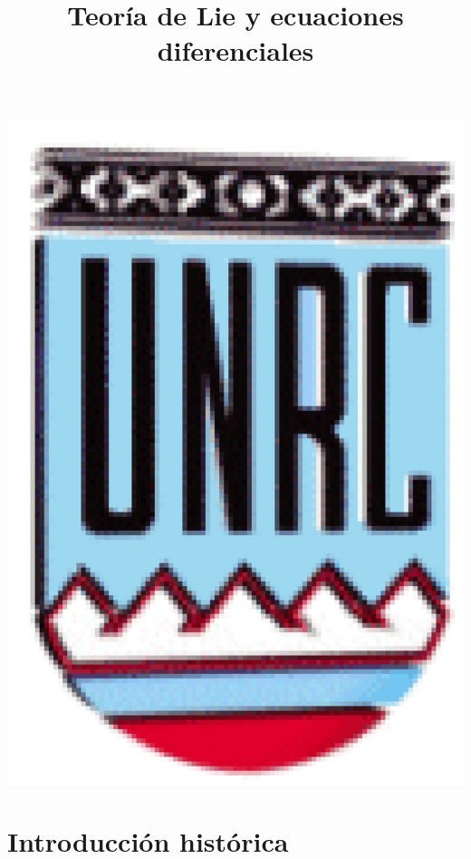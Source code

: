 \documentclass{article}
\title{Teoría de Lie y ecuaciones diferenciales}
\begin{document}
  \maketitle
  \begin{center}
   \includegraphics[scale=0.2]{imagenes/unrc.jpg}
   \end{center}

\tableofcontents



\section{Introducción histórica}
\end{document}
